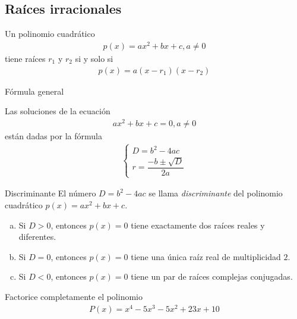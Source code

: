 \subsection{Raíces irracionales}


Un polinomio cuadrático 
\begin{align*}
	p(x)=ax^{2}+bx+c, a\neq 0
\end{align*}
tiene raíces $r_{1}$ y $r_{2}$ si y solo si 
\begin{align*}
p(x) = a\left( x-r_{1} \right)\left( x-r_{2} \right)
\end{align*}


{Fórmula general}
	\begin{prop}
	Las soluciones de la ecuación 
	\begin{align*}
		ax^{2}+bx+c=0, a\neq 0
\end{align*}
están dadas por la fórmula 
\begin{align*}
\begin{cases}
D = b^{2}-4ac \\
r = \dfrac{-b\pm\sqrt{D}}{2a}
\end{cases}
\end{align*}

	\end{prop}


{Discriminante}
El número $D=b^{2}-4ac$ se llama \emph{discriminante} del polinomio cuadrático $p(x)= ax^{2}+bx+c$.



\begin{cor}
\begin{enumerate}[(a)]
\item Si $D>0$, entonces $p(x)=0$ tiene exactamente dos raíces reales y diferentes.
\item Si $D=0$, entonces $p(x)=0$ tiene una única raíz real de multiplicidad $2$.
\item Si $D<0$, entonces $p(x)=0$ tiene un par de raíces complejas conjugadas.
\end{enumerate}

\end{cor}



\begin{problema}
Factorice completamente el polinomio
\begin{align*}
P(x) = x^{4}-5x^{3}-5x^{2}+23x+10
\end{align*}
\end{problema}


